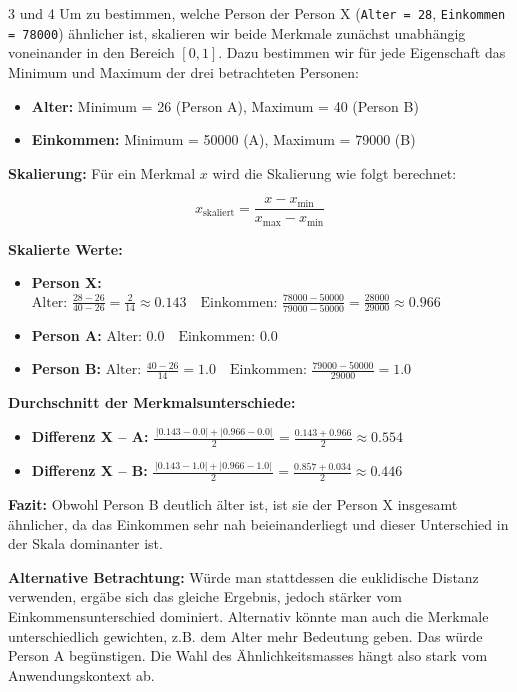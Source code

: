 \begin{aufgabe}{3 und 4}
Um zu bestimmen, welche Person der Person X (\texttt{Alter = 28}, \texttt{Einkommen = 78000}) ähnlicher ist, skalieren wir beide Merkmale zunächst unabhängig voneinander in den Bereich $[0,1]$. Dazu bestimmen wir für jede Eigenschaft das Minimum und Maximum der drei betrachteten Personen:

\begin{itemize}
\item \textbf{Alter:} Minimum = 26 (Person A), Maximum = 40 (Person B)
\item \textbf{Einkommen:} Minimum = 50000 (A), Maximum = 79000 (B)
\end{itemize}

\textbf{Skalierung:}
Für ein Merkmal $x$ wird die Skalierung wie folgt berechnet:

$$
x_{\text{skaliert}} = \frac{x - x_{\min}}{x_{\max} - x_{\min}}
$$

\textbf{Skalierte Werte:}

\begin{itemize}
\item \textbf{Person X:}
$     \text{Alter: } \frac{28 - 26}{40 - 26} = \frac{2}{14} \approx 0.143 \quad\text{Einkommen: } \frac{78000 - 50000}{79000 - 50000} = \frac{28000}{29000} \approx 0.966
    $
\item \textbf{Person A:}
$     \text{Alter: } 0.0 \quad\text{Einkommen: } 0.0
    $
\item \textbf{Person B:}
$     \text{Alter: } \frac{40 - 26}{14} = 1.0 \quad\text{Einkommen: } \frac{79000 - 50000}{29000} = 1.0
    $
\end{itemize}

\textbf{Durchschnitt der Merkmalsunterschiede:}

\begin{itemize}
\item \textbf{Differenz X – A:}
$     \frac{\,|0.143 - 0.0| + |0.966 - 0.0|\,}{2} = \frac{0.143 + 0.966}{2} \approx 0.554
    $
\item \textbf{Differenz X – B:}
$     \frac{\,|0.143 - 1.0| + |0.966 - 1.0|\,}{2} = \frac{0.857 + 0.034}{2} \approx 0.446
    $
\end{itemize}

\textbf{Fazit:} Obwohl Person B deutlich älter ist, ist sie der Person X insgesamt ähnlicher, da das Einkommen sehr nah beieinanderliegt und dieser Unterschied in der Skala dominanter ist.

\vspace{1em}

\textbf{Alternative Betrachtung:}
Würde man stattdessen die euklidische Distanz verwenden, ergäbe sich das gleiche Ergebnis, jedoch stärker vom Einkommensunterschied dominiert. Alternativ könnte man auch die Merkmale unterschiedlich gewichten, z.B. dem Alter mehr Bedeutung geben. Das würde Person A begünstigen. Die Wahl des Ähnlichkeitsmasses hängt also stark vom Anwendungskontext ab.

\end{aufgabe}


